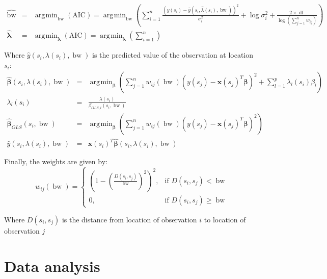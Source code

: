 \documentclass[authoryear, review, 11pt]{elsarticle}
\DeclareMathOperator*{\argmin}{\arg\!\min}
\DeclareMathOperator*{\bw}{\mbox{bw}}
\DeclareMathOperator*{\df}{\mbox{df}}
\begin{document}
		 \begin{eqnarray*}
			\hat{\bw} &=& \argmin_{\text{bw}} \left( \mbox{AIC} \right)  = \argmin_{\text{bw}} \left( \sum_{i = 1}^n \frac{ \left(y(s_i)-\hat{y}\left(s_i, \hat{\lambda}(s_i), \bw \right) \right)^2 }{\sigma_i^2} + \log{\sigma_i^2} + \frac{2 \times \df}{\log{ \left(\sum_{j=1}^n w_{ij} \right) }} \right)\\	
			\hat{\bm{\lambda}} &=& \argmin_{\bm{\lambda}} \left( \mbox{AIC} \right)  = \argmin_{\bm{\lambda}} \left( \sum_{i = 1}^n \right) 
		\end{eqnarray*}
		
		Where $\hat{y}\left(s_i, \lambda(s_i), \bw \right)$ is the predicted value of the observation at location $s_i$:
		\begin{eqnarray*}
			\hat{\bm{\beta}}\left(s_i, \lambda(s_i), \bw \right) &=& \argmin_{\bm{\beta}} \left( \sum_{j = 1}^n w_{ij}(\bw)\left(y(s_j) - \bm{x}(s_j)^T \bm{\beta}\right)^2  +  \sum_{l=1}^p \lambda_{l}(s_i) \beta_l \right)\\
			\lambda_{l}(s_i) &=& \frac{\lambda(s_i)}{\beta_{OLS,l}(s_i, \bw)}\\
			\hat{\bm{\beta}}_{OLS}(s_i, \bw) &=& \argmin_{\bm{\beta}} \left( \sum_{j=1}^{n} w_{ij}(\bw)\left(y(s_j) - \bm{x}(s_j)^T \bm{\beta}\right)^2\right)\\
			\hat{y}\left(s_i, \lambda(s_i), \bw \right) &=& \bm{x}(s_i)^T \hat{\bm{\beta}}\left(s_i, \lambda(s_i), \bw \right)
		\end{eqnarray*}
		
		Finally, the weights are given by:
		\[
			w_{ij}(\bw) =  \begin{cases} \left(1-\left(\frac{D(s_i,s_j)}{\bw}\right)^2\right)^2, & \mbox{if } D(s_i,s_j) < \bw \\
			0, & \mbox{if }D(s_i,s_j) \ge \bw \end{cases}
		\]
		
		Where $D(s_i,s_j)$ is the distance from location of observation $i$ to location of observation $j$\\
		
		
	\section{Data analysis}
\end{document}
